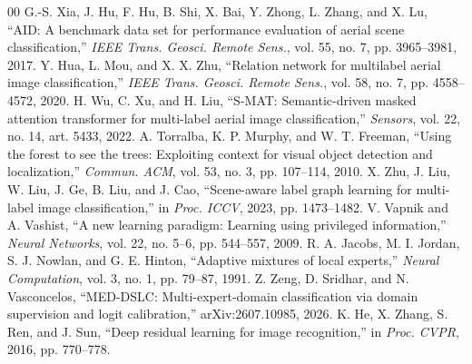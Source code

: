 \documentclass[9pt, conference, a4paper]{IEEEtran}
\begin{document}
\begin{thebibliography}{00}
 G.-S. Xia, J. Hu, F. Hu, B. Shi, X. Bai, Y. Zhong, L. Zhang, and X. Lu, ``AID: A benchmark data set for performance evaluation of aerial scene classification,'' \textit{IEEE Trans. Geosci. Remote Sens.}, vol. 55, no. 7, pp. 3965--3981, 2017.
 Y. Hua, L. Mou, and X. X. Zhu, ``Relation network for multilabel aerial image classification,'' \textit{IEEE Trans. Geosci. Remote Sens.}, vol. 58, no. 7, pp. 4558--4572, 2020.
 H. Wu, C. Xu, and H. Liu, ``S-MAT: Semantic-driven masked attention transformer for multi-label aerial image classification,'' \textit{Sensors}, vol. 22, no. 14, art. 5433, 2022.
 A. Torralba, K. P. Murphy, and W. T. Freeman, ``Using the forest to see the trees: Exploiting context for visual object detection and localization,'' \textit{Commun. ACM}, vol. 53, no. 3, pp. 107--114, 2010.
 X. Zhu, J. Liu, W. Liu, J. Ge, B. Liu, and J. Cao, ``Scene-aware label graph learning for multi-label image classification,'' in \textit{Proc. ICCV}, 2023, pp. 1473--1482.
 V. Vapnik and A. Vashist, ``A new learning paradigm: Learning using privileged information,'' \textit{Neural Networks}, vol. 22, no. 5--6, pp. 544--557, 2009.
 R. A. Jacobs, M. I. Jordan, S. J. Nowlan, and G. E. Hinton, ``Adaptive mixtures of local experts,'' \textit{Neural Computation}, vol. 3, no. 1, pp. 79--87, 1991.
 Z. Zeng, D. Sridhar, and N. Vasconcelos, ``MED-DSLC: Multi-expert-domain classification via domain supervision and logit calibration,'' arXiv:2607.10985, 2026.
 K. He, X. Zhang, S. Ren, and J. Sun, ``Deep residual learning for image recognition,'' in \textit{Proc. CVPR}, 2016, pp. 770--778.
\end{thebibliography}
\end{document}
